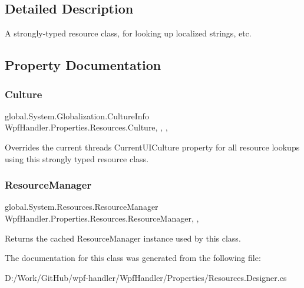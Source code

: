 \subsection{Detailed Description}
A strongly-\/typed resource class, for looking up localized strings, etc. 



\subsection{Property Documentation}
\mbox{\label{class_wpf_handler_1_1_properties_1_1_resources_a9d6eb037cf7891a3ed5b2370e7dfdc23}} 
\subsubsection{\texorpdfstring{Culture}{Culture}}
{\footnotesize\ttfamily global.\+System.\+Globalization.\+Culture\+Info Wpf\+Handler.\+Properties.\+Resources.\+Culture\hspace{0.3cm}{\ttfamily [static]}, {\ttfamily [get]}, {\ttfamily [set]}, {\ttfamily [package]}}



Overrides the current thread\textquotesingle{}s Current\+U\+I\+Culture property for all resource lookups using this strongly typed resource class. 

\mbox{\label{class_wpf_handler_1_1_properties_1_1_resources_a4908c4924066b6d42cc0e042fdae5079}} 
\subsubsection{\texorpdfstring{Resource\+Manager}{ResourceManager}}
{\footnotesize\ttfamily global.\+System.\+Resources.\+Resource\+Manager Wpf\+Handler.\+Properties.\+Resources.\+Resource\+Manager\hspace{0.3cm}{\ttfamily [static]}, {\ttfamily [get]}, {\ttfamily [package]}}



Returns the cached Resource\+Manager instance used by this class. 



The documentation for this class was generated from the following file\+:\begin{DoxyCompactItemize}
\item 
D\+:/\+Work/\+Git\+Hub/wpf-\/handler/\+Wpf\+Handler/\+Properties/Resources.\+Designer.\+cs\end{DoxyCompactItemize}
